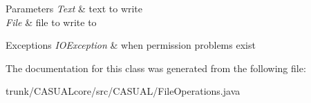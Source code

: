 \begin{DoxyParams}{Parameters}
{\em Text} & text to write \\
\hline
{\em File} & file to write to \\
\hline
\end{DoxyParams}

\begin{DoxyExceptions}{Exceptions}
{\em I\-O\-Exception} & when permission problems exist \\
\hline
\end{DoxyExceptions}


The documentation for this class was generated from the following file\-:\begin{DoxyCompactItemize}
\item 
trunk/\-C\-A\-S\-U\-A\-Lcore/src/\-C\-A\-S\-U\-A\-L/File\-Operations.\-java\end{DoxyCompactItemize}

